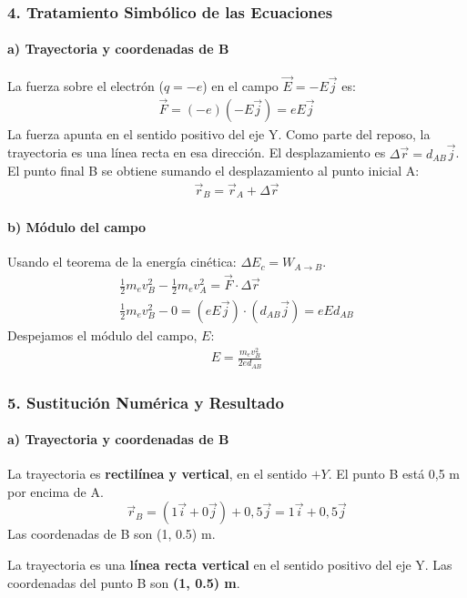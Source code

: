 \subsubsection*{4. Tratamiento Simbólico de las Ecuaciones}
\paragraph{a) Trayectoria y coordenadas de B}
La fuerza sobre el electrón ($q=-e$) en el campo $\vec{E}=-E\vec{j}$ es:
\begin{gather}
    \vec{F} = (-e)(-E\vec{j}) = eE\vec{j}
\end{gather}
La fuerza apunta en el sentido positivo del eje Y. Como parte del reposo, la trayectoria es una línea recta en esa dirección. El desplazamiento es $\Delta\vec{r} = d_{AB}\vec{j}$.
El punto final B se obtiene sumando el desplazamiento al punto inicial A:
\begin{gather}
    \vec{r}_B = \vec{r}_A + \Delta\vec{r}
\end{gather}
\paragraph{b) Módulo del campo}
Usando el teorema de la energía cinética: $\Delta E_c = W_{A \to B}$.
\begin{gather}
    \frac{1}{2}m_e v_B^2 - \frac{1}{2}m_e v_A^2 = \vec{F} \cdot \Delta\vec{r} \nonumber \\
    \frac{1}{2}m_e v_B^2 - 0 = (eE\vec{j}) \cdot (d_{AB}\vec{j}) = eEd_{AB}
\end{gather}
Despejamos el módulo del campo, $E$:
\begin{gather}
    E = \frac{m_e v_B^2}{2e d_{AB}}
\end{gather}

\subsubsection*{5. Sustitución Numérica y Resultado}
\paragraph{a) Trayectoria y coordenadas de B}
La trayectoria es \textbf{rectilínea y vertical}, en el sentido $+Y$. El punto B está 0,5 m por encima de A.
$$ \vec{r}_B = (1\vec{i} + 0\vec{j}) + 0,5\vec{j} = 1\vec{i} + 0,5\vec{j} $$
Las coordenadas de B son (1, 0.5) m.
\begin{cajaresultado}
La trayectoria es una \textbf{línea recta vertical} en el sentido positivo del eje Y. Las coordenadas del punto B son \textbf{(1, 0.5) m}.
\end{cajaresultado}
